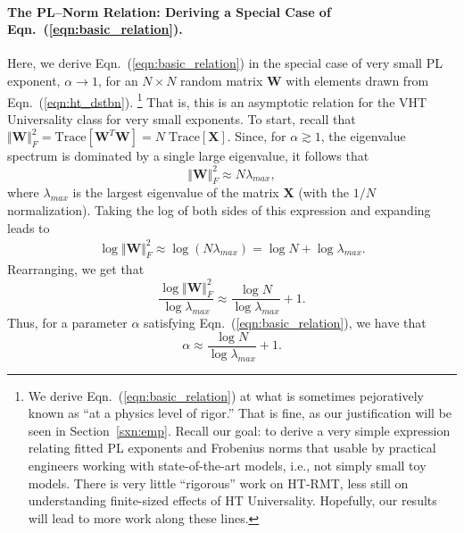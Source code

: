 \paragraph{The PL--Norm Relation: Deriving a Special Case of Eqn.~(\ref{eqn:basic_relation}).}

Here, we derive Eqn.~(\ref{eqn:basic_relation}) in the special case of very small PL exponent, $\alpha \rightarrow 1$,
for an $N \times N$ random matrix $\mathbf{W}$ with elements drawn from Eqn.~(\ref{eqn:ht_dstbn}).%
\footnote{We derive Eqn.~(\ref{eqn:basic_relation}) at what is sometimes pejoratively known as ``at a physics level of rigor.''  That is fine, as our justification will be seen in Section~\ref{sxn:emp}.  Recall our goal: to derive a very simple expression relating fitted PL exponents and Frobenius norms that usable by practical engineers working with state-of-the-art models, i.e., not simply small toy models.  There is very little ``rigorous'' work on HT-RMT, less still on understanding finite-sized effects of HT Universality.  Hopefully, our results will lead to more work along these lines.  }
That is, this is an asymptotic relation for the VHT Universality class for very small exponents.
%
To start, recall that $ \Vert \mathbf{W}\Vert_{F}^{2}=\mbox{Trace}[\mathbf{W}^{T}\mathbf{W}]=N\;\mbox{Trace}[\mathbf{X}]$.
Since, for $\alpha \gtrsim 1$, the eigenvalue spectrum is dominated by a single large eigenvalue, it follows that
$$
\Vert \mathbf{W}\Vert_{F}^{2}\approx N\lambda_{max}  , 
$$
where $\lambda_{max}$ is the largest eigenvalue of the matrix $\mathbf{X}$ (with the $1/N$ normalization).
Taking the log of both sides of this expression and expanding leads to
\begin{eqnarray*}
\log\Vert \mathbf{W}\Vert_{F}^{2} 
   \approx \log \left( N\lambda_{max} \right) 
   =       \log N+\log\lambda_{max}  .
\end{eqnarray*}
Rearranging, we get that 
$$
\dfrac{\log\Vert \mathbf{W}\Vert_{F}^{2}}{\log\lambda_{max}}\approx \dfrac{\log N}{\log\lambda_{max}}+1  .
$$
Thus, for a parameter $\alpha$ satisfying Eqn.~(\ref{eqn:basic_relation}), we have that 
$$
\alpha\approx \dfrac{\log N}{\log\lambda_{max}}+1  .
$$
